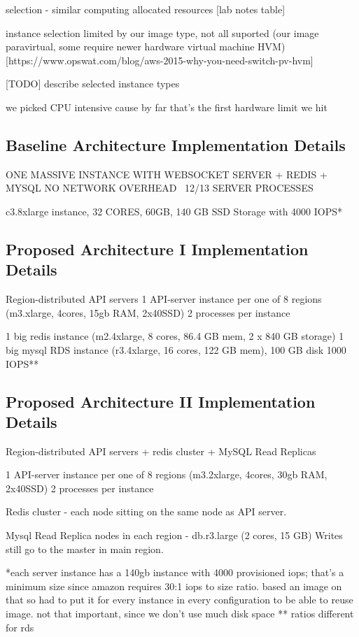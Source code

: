 \documentclass{uvamscse}
\begin{document}
selection - similar computing allocated resources [lab notes table]

instance selection limited by our image type, not all suported (our image paravirtual, some require newer hardware virtual machine HVM) [https://www.opswat.com/blog/aws-2015-why-you-need-switch-pv-hvm]

[TODO] describe selected instance types

we picked CPU intensive cause by far that's the first hardware limit we hit

\subsection{Baseline Architecture Implementation Details}\label{Baseline Architecture Implementation Details}
ONE MASSIVE INSTANCE WITH WEBSOCKET SERVER + REDIS + MYSQL
NO NETWORK OVERHEAD
~12/13 SERVER PROCESSES

c3.8xlarge instance, 32 CORES, 60GB, 140 GB SSD Storage with 4000 IOPS*

\subsection{Proposed Architecture I Implementation Details}\label{Proposed Architecture I Implementation Details}
Region-distributed API servers
1 API-server instance per one of 8 regions (m3.xlarge, 4cores, 15gb RAM, 2x40SSD)
2 processes per instance

1 big redis instance (m2.4xlarge, 8 cores, 86.4 GB mem, 2 x 840 GB storage)
1 big mysql RDS instance (r3.4xlarge, 16 cores, 122 GB mem), 100 GB disk 1000 IOPS**

\subsection{Proposed Architecture II Implementation Details}\label{Proposed Architecture II Implementation Details}
Region-distributed API servers + redis cluster + MySQL Read Replicas

1 API-server instance per one of 8 regions (m3.2xlarge, 4cores, 30gb RAM, 2x40SSD)
2 processes per instance

Redis cluster - each node sitting on the same node as API server.

Mysql Read Replica nodes in each region - db.r3.large (2 cores, 15 GB)
Writes still go to the master in main region.

*each server instance has a 140gb instance with 4000 provisioned iops; that's a minimum size since amazon requires 30:1 iops to size ratio. based an image on that so had to put it for every instance in every configuration to be able to reuse image. not that important, since we don't use much disk space
** ratios different for rds
\end{document}
